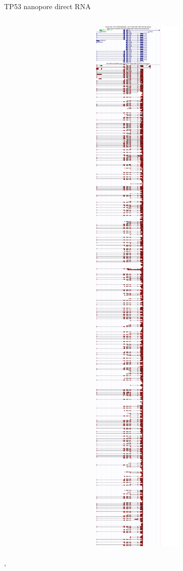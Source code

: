 \documentclass[10pt,
               hyperref={bookmarks=false,
                         bookmarksopen=false,
                         colorlinks=true,
                         linkcolor=blue,
                         urlcolor=blue},
               xcolor={svgnames,table}]{beamer}
\begin{document}
\begin{frame}{TP53 nanopore direct RNA}
\begin{columns}
\begin{column}{0.5\textwidth}
    \end{column}
    \begin{column}{0.5\textwidth}
      \includegraphics[bb=0pt 0pt 429pt 814pt,clip,scale=0.35]{images/tp53-direct-rna-2.pdf}
    \end{column}
  \end{columns}
'\end{frame}
\end{document}
